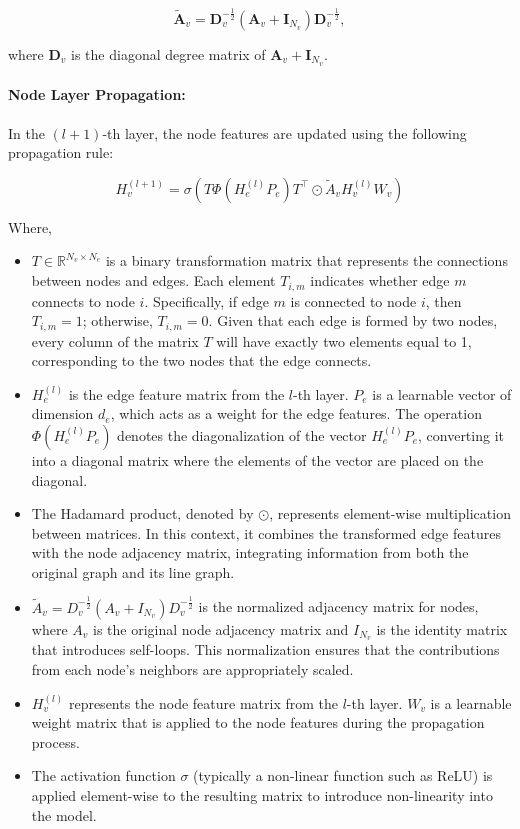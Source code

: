 \begin{equation}
\tilde{\mathbf{A}}_v = \mathbf{D}_v^{-\frac{1}{2}} (\mathbf{A}_v + \mathbf{I}_{N_v}) \mathbf{D}_v^{-\frac{1}{2}},
\end{equation}

where $\mathbf{D}_v$ is the diagonal degree matrix of $\mathbf{A}_v + \mathbf{I}_{N_v}$.

\paragraph{Node Layer Propagation:}


In the $(l+1)$-th layer, the node features are updated using the following propagation rule:

\[
H^{(l+1)}_v = \sigma\left(T\Phi\left(H^{(l)}_e P_e\right)T^\top \odot \tilde{A}_v H^{(l)}_v W_v\right)
\]

Where, 

\begin{itemize}
    \item \( T \in \mathbb{R}^{N_v \times N_e} \) is a binary transformation matrix that represents the connections between nodes and edges. Each element \( T_{i,m} \) indicates whether edge \( m \) connects to node \( i \). Specifically, if edge \( m \) is connected to node \( i \), then \( T_{i,m} = 1 \); otherwise, \( T_{i,m} = 0 \). Given that each edge is formed by two nodes, every column of the matrix \( T \) will have exactly two elements equal to 1, corresponding to the two nodes that the edge connects. 
    \item \( H^{(l)}_e \) is the edge feature matrix from the \( l \)-th layer. \( P_e \) is a learnable vector of dimension \( d_e \), which acts as a weight for the edge features. The operation \( \Phi(H^{(l)}_e P_e) \) denotes the diagonalization of the vector \( H^{(l)}_e P_e \), converting it into a diagonal matrix where the elements of the vector are placed on the diagonal. 
    \item The Hadamard product, denoted by \( \odot \), represents element-wise multiplication between matrices. In this context, it combines the transformed edge features with the node adjacency matrix, integrating information from both the original graph and its line graph.
    \item \( \tilde{A}_v = D_v^{-\frac{1}{2}} (A_v + I_{N_v}) D_v^{-\frac{1}{2}} \) is the normalized adjacency matrix for nodes, where \( A_v \) is the original node adjacency matrix and \( I_{N_v} \) is the identity matrix that introduces self-loops. This normalization ensures that the contributions from each node's neighbors are appropriately scaled. 
    \item \( H^{(l)}_v \) represents the node feature matrix from the \( l \)-th layer. \( W_v \) is a learnable weight matrix that is applied to the node features during the propagation process. 
    \item The activation function \( \sigma \) (typically a non-linear function such as ReLU) is applied element-wise to the resulting matrix to introduce non-linearity into the model.

\end{itemize}


